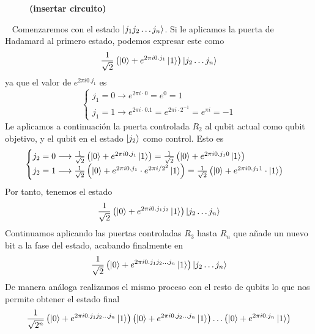 \documentclass[a4paper]{article}
\numberwithin{equation}{section}
\begin{document}
\begin{figure}[h] \label{fig_qft}
\textbf{(insertar circuito)}
\end{figure}\ \linebreak
Comenzaremos con el estado $\ket{j_1 j_2 \ldots j_n}$. Si le aplicamos la puerta de Hadamard al primero estado, podemos expresar este como
\begin{equation}
\frac{1}{\sqrt{2}}\left( \ket{0} + e^{2\pi i 0.j_1}\ket{1} \right)
\ket{j_2 \ldots j_n}
\end{equation}
ya que el valor de $e^{2\pi i 0.j_1}$ es
\begin{equation}
\begin{cases}
j_1 = 0 \longrightarrow e^{2\pi i \cdot 0} = e^0 = 1 \\
j_1 = 1 \longrightarrow e^{2\pi i \cdot 0.\text{1}} = e^{2\pi i \cdot 2^{-1}} = e^{\pi i} = -1
\end{cases}
\end{equation}
Le aplicamos a continuación la puerta controlada $R_2$ al qubit actual como qubit objetivo, y el qubit en el estado $\ket{j_2}$ como control.
Esto es
\begin{equation}
\begin{cases}
j_2 = 0 \longrightarrow \frac{1}{\sqrt{2}}\left( \ket{0} + e^{2\pi i 0.j_1} \ket{1} \right)
=
\frac{1}{\sqrt{2}}\left( \ket{0} + e^{2\pi i 0.j_1 0} \ket{1} \right) \\
j_2 = 1 \longrightarrow
\frac{1}{\sqrt{2}}\left( \ket{0} + e^{2\pi i 0.j_1}\cdot e^{2\pi i/2^2} \ket{1} \right)
=
\frac{1}{\sqrt{2}}\left( \ket{0} + e^{2\pi i 0.j_1 1}\cdot \ket{1} \right)
\end{cases}
\end{equation}
Por tanto, tenemos el estado
\begin{equation}
\frac{1}{\sqrt{2}}\left( \ket{0} + e^{2\pi i 0.j_1 j_2}\ket{1} \right)
\ket{j_2 \ldots j_n}
\end{equation}
Continuamos aplicando las puertas controladas $R_3$ hasta $R_n$ que añade un nuevo bit a la fase del estado, acabando finalmente en
\begin{equation}
\frac{1}{\sqrt{2}}\left( \ket{0} + e^{2\pi i 0.j_1 j_2\ldots j_n}\ket{1} \right)
\ket{j_2 \ldots j_n}
\end{equation}
De manera análoga realizamos el mismo proceso con el resto de qubits lo que nos permite obtener el estado final
\begin{equation}
\frac{1}{\sqrt{2^n}}
\left( \ket{0} + e^{2\pi i 0.j_1 j_2\ldots j_n}\ket{1} \right)
\left( \ket{0} + e^{2\pi i 0.j_2\ldots j_n}\ket{1} \right)
\ldots
\left( \ket{0} + e^{2\pi i 0.j_n}\ket{1} \right)
\end{equation}
\end{document}
